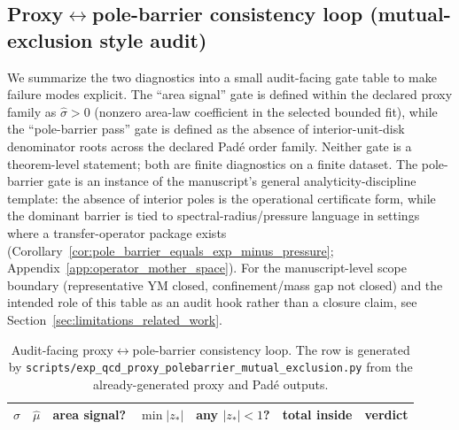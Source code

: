 \subsection{Proxy$\leftrightarrow$pole-barrier consistency loop (mutual-exclusion style audit)}
\label{subsec:qcd_proxy_polebarrier_consistency_loop}
\AuditTag We summarize the two diagnostics into a small audit-facing gate table to make failure modes explicit.
The ``area signal'' gate is defined within the declared proxy family as $\widehat\sigma>0$ (nonzero area-law coefficient in the selected bounded fit), while the ``pole-barrier pass'' gate is defined as the absence of interior-unit-disk denominator roots across the declared Pad\'e order family.
Neither gate is a theorem-level statement; both are finite diagnostics on a finite dataset.
\AuditTag The pole-barrier gate is an instance of the manuscript's general analyticity-discipline template: the absence of interior poles is the operational certificate form, while the dominant barrier is tied to spectral-radius/pressure language in settings where a transfer-operator package exists (Corollary~\ref{cor:pole_barrier_equals_exp_minus_pressure}; Appendix~\ref{app:operator_mother_space}).
\AuditTag For the manuscript-level scope boundary (representative YM closed, confinement/mass gap not closed) and the intended role of this table as an audit hook rather than a closure claim, see Section~\ref{sec:limitations_related_work}.

%

\begin{table}[t]
\centering
\scriptsize
\setlength{\tabcolsep}{8pt}
\renewcommand{\arraystretch}{1.15}
\begin{tabular}{rrrrrrl}
\toprule
$\widehat\sigma$ & $\widehat\mu$ & area signal? & $\min|z_\ast|$ & any $|z_\ast|<1$? & total inside & verdict \\
\midrule
%
\end{tabular}
\caption{Audit-facing proxy$\leftrightarrow$pole-barrier consistency loop. The row is generated by \texttt{scripts/exp\_qcd\_proxy\_polebarrier\_mutual\_exclusion.py} from the already-generated proxy and Pad\'e outputs.}
\label{tab:qcd_proxy_polebarrier_failure}
\end{table}

